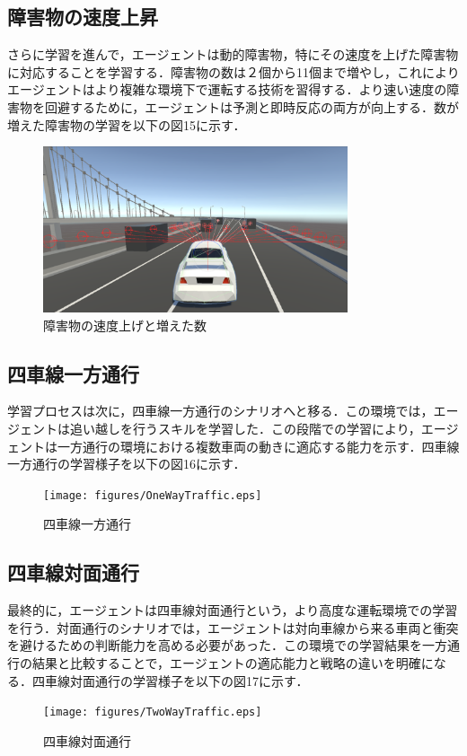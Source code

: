 \subsection{障害物の速度上昇}
さらに学習を進んで，エージェントは動的障害物，特にその速度を上げた障害物に対応することを学習する．障害物の数は２個から11個まで増やし，これによりエージェントはより複雑な環境下で運転する技術を習得する．より速い速度の障害物を回避するために，エージェントは予測と即時反応の両方が向上する．数が増えた障害物の学習を以下の図15に示す．
\begin{figure}[H]
    \centering
    \includegraphics[width=0.8\textwidth]{figures/MovingObstacles.eps} %
    \caption{障害物の速度上げと増えた数} %
    \label{fig:moving-obstacles} %
\end{figure}

\subsection{四車線一方通行}
学習プロセスは次に，四車線一方通行のシナリオへと移る．この環境では，エージェントは追い越しを行うスキルを学習した．この段階での学習により，エージェントは一方通行の環境における複数車両の動きに適応する能力を示す．四車線一方通行の学習様子を以下の図16に示す．
\begin{figure}[H]
    \centering
    \texttt{[image: figures/OneWayTraffic.eps]} %
    \caption{四車線一方通行} %
    \label{fig:one-way-traffic} %
\end{figure}

\subsection{四車線対面通行}
最終的に，エージェントは四車線対面通行という，より高度な運転環境での学習を行う．対面通行のシナリオでは，エージェントは対向車線から来る車両と衝突を避けるための判断能力を高める必要があった．この環境での学習結果を一方通行の結果と比較することで，エージェントの適応能力と戦略の違いを明確になる．四車線対面通行の学習様子を以下の図17に示す．
\begin{figure}[H]
    \centering
    \texttt{[image: figures/TwoWayTraffic.eps]} %
    \caption{四車線対面通行} %
    \label{fig:two-way-traffic} %
\end{figure}

